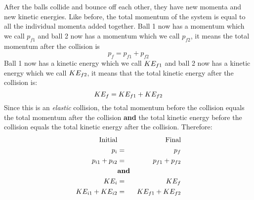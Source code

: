 After the balls collide and bounce off each other, they have new momenta and new kinetic energies. Like before, the total momentum of the system is equal to all the individual momenta added together. Ball 1 now has a momentum
which we call $p_{f1}$ and ball 2 now has a momentum which we call $p_{f2}$, it means the total momentum after the collision is
\begin{equation*}
\label{eq:pc:types:elast:after:P}
p_{f} = p_{f1}+p_{f2}
\end{equation*}
Ball 1 now has a kinetic energy which we call $KE_{f1}$ and ball 2 now has a kinetic energy which we call $KE_{f2}$, it means that the total kinetic energy after the collision is:
\begin{equation*}
\label{eq:pc:types:elast:after:K}
KE_{f} = KE_{f1}+KE_{f2}
\end{equation*}
Since this is an \emph{elastic} collision, the total momentum before the collision equals the total momentum after the collision \textbf{and} the total kinetic energy before the collision equals the total kinetic energy after the collision. Therefore:
\begin{eqnarray*}
\nonumber
\mbox{Initial}&&\mbox{Final}\\
\label{eq:pc:types:elast:conserveP}
p_{i} &=& p_{f}\\\nonumber
p_{i1}+p_{i2} &=& p_{f1}+p_{f2} \\\nonumber
&\text{\textbf{and}}&\\
\label{eq:pc:types:elast:conserveK}
KE_{i} &=& KE_{f} \\\nonumber
KE_{i1}+KE_{i2} &=& KE_{f1}+KE_{f2}
\end{eqnarray*}

